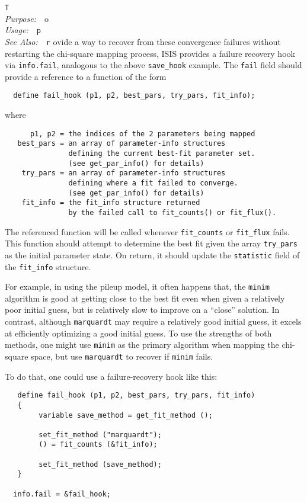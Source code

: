 \documentclass{book}
\makeatletter
\newif\ifpdf
\newenvironment{isisfunction}[4]%
{\index{{#1}@{\tt #1}}%
  \ifpdf
  \else
     \addcontentsline{toc}{subsection}{{#1} -- {#2}}
  \fi
  \vbox{
          \vspace*{\baselineskip}
          {\LARGE\tt #1}\vspace*{\baselineskip}\\
          {{\it Purpose:}~~{#2}}\\
          {{\it Usage:}~~{\tt #3}}\\
          {{\it See Also:}~~{\tt #4}}
       }
}%
{ }
\makeatother
\begin{document}
{\begin{isisfunction}
To provide a way to recover from these convergence failures
without restarting the chi-square mapping process, ISIS provides
a failure recovery hook via \verb|info.fail|, analogous
to the above \verb|save_hook| example.
The \verb|fail| field should provide a reference to
a function of the form
\begin{verbatim}
  define fail_hook (p1, p2, best_pars, try_pars, fit_info);
\end{verbatim}
where
\begin{verbatim}
      p1, p2 = the indices of the 2 parameters being mapped
   best_pars = an array of parameter-info structures
               defining the current best-fit parameter set.
               (see get_par_info() for details)
    try_pars = an array of parameter-info structures
               defining where a fit failed to converge.
               (see get_par_info() for details)
    fit_info = the fit_info structure returned
               by the failed call to fit_counts() or fit_flux().
\end{verbatim}
The referenced function will be called whenever \verb|fit_counts| or
\verb|fit_flux| fails.  This function should attempt to determine
the best fit given the array \verb|try_pars| as the initial
parameter state.  On return, it should update the \verb|statistic|
field of the \verb|fit_info| structure.

For example, in using the pileup model, it often happens that, the
\verb|minim| algorithm is good at getting close to the best fit
even when given a relatively poor initial guess, but is relatively
slow to improve on a ``close'' solution. In contrast, although
\verb|marquardt| may require a relatively good initial guess, it
excels at efficiently optimizing a good initial guess. To use the
strengths of both methods, one might use \verb|minim| as the
primary algorithm when mapping the chi-square space, but use
\verb|marquardt| to recover if \verb|minim| fails.

To do that, one could use a failure-recovery hook like this:
\begin{verbatim}
   define fail_hook (p1, p2, best_pars, try_pars, fit_info)
   {
        variable save_method = get_fit_method ();

        set_fit_method ("marquardt");
        () = fit_counts (&fit_info);

        set_fit_method (save_method);
   }

  info.fail = &fail_hook;
\end{verbatim}


\end{isisfunction}}
\end{document}

